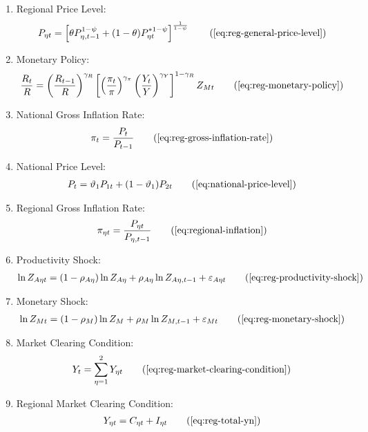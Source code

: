 \documentclass[
thesis.tex
]{subfiles}
\begin{document}
{\begin{itemize}
\begin{enumerate}
		\item Regional Price Level:
		\begin{align}
			P_{\eta t} = \left[ \theta P_{\eta,t-1}^{1-\psi} + (1-\theta) P_{\eta t}^{\ast 1-\psi} \right]^\frac{1}{1-\psi} \tag{\ref{eq:reg-general-price-level}}
		\end{align}

		\item Monetary Policy:
		\begin{align}
			\frac{R_{t}}{R} = \left( \frac{R_{t-1}}{R} \right)^{\gamma_R} \left[ \left( \frac{\pi_t}{\pi} \right)^{\gamma_\pi} \left( \frac{Y_t}{Y} \right)^{\gamma_Y} \right]^{1-\gamma_R} Z_{Mt} \tag{\ref{eq:reg-monetary-policy}}
		\end{align}
			
		\item National Gross Inflation Rate:
		\begin{align}
			\pi_t = \frac{P_t}{P_{t-1}} \tag{\ref{eq:reg-gross-inflation-rate}}
		\end{align}
			
		\item National Price Level:
		\begin{align}
			P_t = \vartheta_1 P_{1 t} + (1 -\vartheta_1) P_{2 t} \tag{\ref{eq:national-price-level}}
		\end{align}
			
		\item Regional Gross Inflation Rate:
		\begin{align}
			\pi_{\eta t} = \frac{P_{\eta t}}{P_{\eta, t-1}} \tag{\ref{eq:regional-inflation}}
		\end{align}
			
		\item Productivity Shock:
		\begin{align}
			\ln{Z_{A\eta t}} = (1-\rho_{A\eta})\ln{Z_{A\eta}} + \rho_{A\eta}\ln{Z_{A\eta,t-1}} + \varepsilon_{A\eta t} \tag{\ref{eq:reg-productivity-shock}}
		\end{align}
			
		\item Monetary Shock:
		\begin{align}
			\ln{Z_{Mt}} = (1-\rho_M)\ln{Z_{M}} + \rho_M\ln{Z_{M,t-1}} + \varepsilon_{Mt} \tag{\ref{eq:reg-monetary-shock}}
		\end{align}

		\item Market Clearing Condition:
		\begin{align}
			Y_t = \sum_{\eta=1}^{2} Y_{\eta t} \tag{\ref{eq:reg-market-clearing-condition}}
		\end{align}
		
		\item Regional Market Clearing Condition:
		\begin{align}
			Y_{\eta t} = C_{\eta t} + I_{\eta t} \tag{\ref{eq:reg-total-yn}}
		\end{align}
			
		\end{enumerate}
		
	\end{itemize}
	
} %
\end{document}
